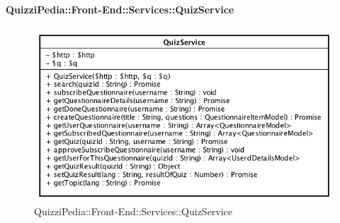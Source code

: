 \paragraph{QuizziPedia::Front-End::Services::QuizService}

\label{QuizziPedia::Front-End::Services::QuizService}
\begin{figure}[ht]
	\centering
	\includegraphics[scale=0.80]{UML/Classi/Front-End/QuizziPedia_Front-end_Services_QuizService.png}
	\caption{QuizziPedia::Front-End::Services::QuizService}
\end{figure}\FloatBarrier
